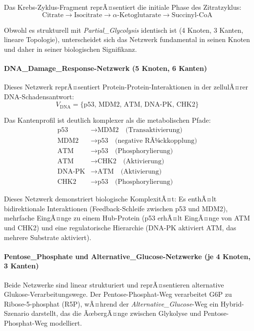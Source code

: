 ﻿\documentclass[a4paper,12pt]{article}
\theoremstyle{definition}
\begin{document}
Das Krebs-Zyklus-Fragment reprÃ¤sentiert die initiale Phase des Zitratzyklus:
\[
\text{Citrate} \rightarrow \text{Isocitrate} \rightarrow \text{\(\alpha\)-Ketoglutarate} \rightarrow \text{Succinyl-CoA}
\]

Obwohl es strukturell mit \textit{Partial\_Glycolysis} identisch ist (4 Knoten, 3 Kanten, lineare Topologie), unterscheidet sich das Netzwerk fundamental in seinen Knoten und daher in seiner biologischen Signifikanz.

\paragraph{DNA\_Damage\_Response-Netzwerk (5 Knoten, 6 Kanten)}

Dieses Netzwerk reprÃ¤sentiert Protein-Protein-Interaktionen in der zellulÃ¤rer DNA-Schadensantwort:
\[
V_{\text{DNA}} = \{\text{p53, MDM2, ATM, DNA-PK, CHK2}\}
\]

Das Kantenprofil ist deutlich komplexer als die metabolischen Pfade:
\begin{align*}
	\text{p53} &\rightarrow \text{MDM2} \quad \text{(Transaktivierung)} \\
	\text{MDM2} &\rightarrow \text{p53} \quad \text{(negative RÃ¼ckkopplung)} \\
	\text{ATM} &\rightarrow \text{p53} \quad \text{(Phosphorylierung)} \\
	\text{ATM} &\rightarrow \text{CHK2} \quad \text{(Aktivierung)} \\
	\text{DNA-PK} &\rightarrow \text{ATM} \quad \text{(Aktivierung)} \\
	\text{CHK2} &\rightarrow \text{p53} \quad \text{(Phosphorylierung)}
\end{align*}

Dieses Netzwerk demonstriert biologische KomplexitÃ¤t: Es enthÃ¤lt bidirektionale Interaktionen (Feedback-Schleife zwischen p53 und MDM2), mehrfache EingÃ¤nge zu einem Hub-Protein (p53 erhÃ¤lt EingÃ¤nge von ATM und CHK2) und eine regulatorische Hierarchie (DNA-PK aktiviert ATM, das mehrere Substrate aktiviert).

\paragraph{Pentose\_Phosphate und Alternative\_Glucose-Netzwerke (je 4 Knoten, 3 Kanten)}

Beide Netzwerke sind linear strukturiert und reprÃ¤sentieren alternative Glukose-Verarbeitungswege. Der Pentose-Phosphat-Weg verarbeitet G6P zu Ribose-5-phosphat (R5P), wÃ¤hrend der \textit{Alternative\_Glucose}-Weg ein Hybrid-Szenario darstellt, das die ÃœbergÃ¤nge zwischen Glykolyse und Pentose-Phosphat-Weg modelliert.
\end{document}
